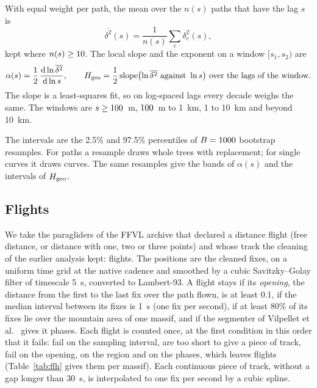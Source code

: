 With equal weight per path, the mean over the $n(s)$ paths that have the lag $s$ is
\begin{equation}
  \overline{\delta^2}(s)=\frac1{n(s)}\sum_{c}\delta_c^2(s),
  \label{eq:mean}
\end{equation}
kept where $n(s)\ge10$. The local slope and the exponent on a window $[s_1,s_2)$ are
\begin{equation}
  \alpha(s)=\frac12\,\frac{\mathrm{d}\ln\overline{\delta^2}}{\mathrm{d}\ln s},\qquad
  \Hgeo=\frac12\,\mathrm{slope}\bigl(\ln\overline{\delta^2}\ \text{against}\ \ln s\bigr)\ \text{over the lags of the window}.
  \label{eq:alphaloc}
\end{equation}
The slope is a least-squares fit, so on log-spaced lags every decade weighs the same. The windows are $s\ge100$~m,
$100$~m to 1~km, 1 to 10~km and beyond 10~km.

The intervals are the 2.5\% and 97.5\% percentiles of $B=1000$ bootstrap resamples. For paths a resample draws whole trees with
replacement; for single curves it draws curves. The same resamples give the bands of $\alpha(s)$ and the intervals of $H_{\mathrm{geo}}$.

\subsection{Flights}\label{sec:flsel}

We take the paragliders of the FFVL archive that declared a distance flight (free distance, or distance with one, two or three points)
and whose track the cleaning of the earlier analysis kept: \flCandPara{} flights. The positions are the cleaned fixes, on a uniform time grid at the
native cadence and smoothed by a cubic Savitzky--Golay filter of timescale 5~s, converted to Lambert-93. A flight stays if its \emph{opening}, the distance from
the first to the last fix over the path flown, is at least 0.1, if the median interval between its fixes is 1~s (one fix per second), if at least 80\% of its fixes lie over the
mountain area of one massif, and if the segmenter of Vilpellet et al.~\cite{vilpellet} gives it phases. Each flight is counted once, at the first condition in this order that it fails:
\flStatDtPara{} fail on the sampling interval, \flStatShortPara{} are too short to give a piece of track, \flStatOpeningPara{} fail on the opening,
\flStatRegionPara{} on the region and \flStatPhasesPara{} on the phases, which leaves
\flStatOkPara{} flights (Table~\ref{tab:flh} gives them per massif). Each continuous piece of track, without a gap longer than 30~s, is interpolated to one fix per
second by a cubic spline.


